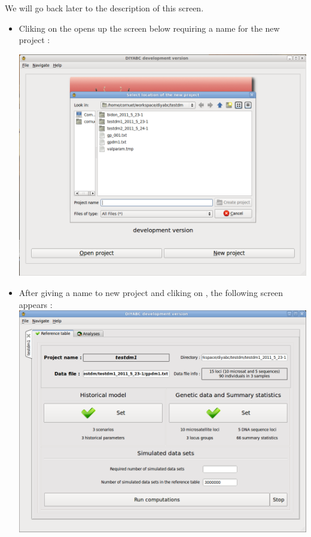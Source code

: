 We will go back later to the description of this screen.
\begin{itemize}
 \item 
  Cliking on the  opens up the screen below requiring a name for the new project :\\
\begin{center}
\includegraphics[scale=0.35]{gui_pictures/Capture-DIYABC-7.png} 
\end{center}
\item
After giving a name to new project and cliking on , the following screen appears :\\ 

\includegraphics[scale=0.35]{gui_pictures/Capture-DIYABC-6.png} 

\end{itemize}


